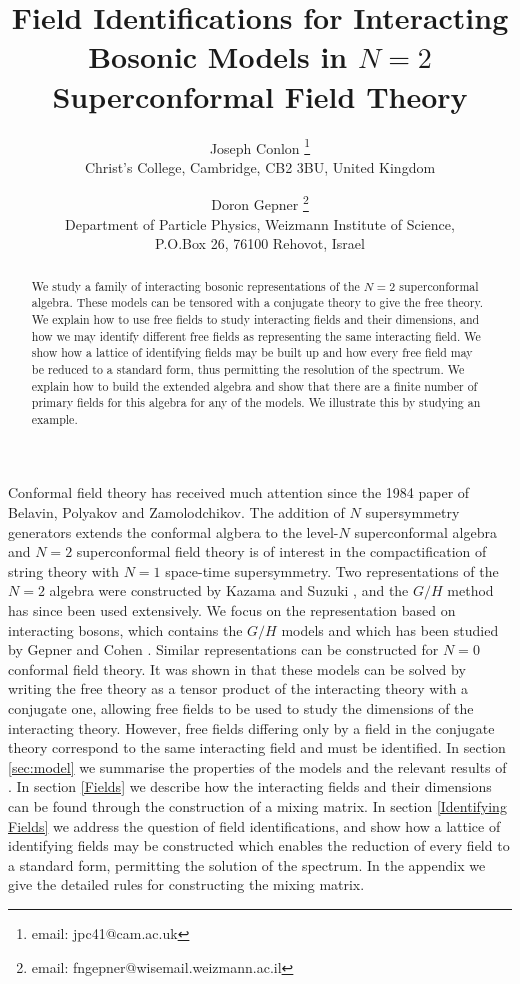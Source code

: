 \documentclass[a4paper,a4paper]{article}
\title{Field Identifications for Interacting Bosonic Models in $N=2$ Superconformal Field Theory}
\author{Joseph Conlon \footnote{email: jpc41@cam.ac.uk} \\ Christ's College, Cambridge, CB2 3BU, United Kingdom 
\and Doron Gepner \footnote{email: fngepner@wisemail.weizmann.ac.il}
\\Department of Particle Physics, Weizmann Institute of Science,\\ P.O.Box 26, 76100 Rehovot, Israel}
\begin{document}
\maketitle

\begin{abstract}
We study a family of interacting bosonic representations of the $N=2$ superconformal algebra. These models can
be tensored with a conjugate theory to give the free theory. We explain how to use
free fields to study interacting fields and their dimensions, and how we may
identify different free fields as representing the same interacting field. We show how a lattice of identifying fields
may be built up and how every free field may be reduced to a standard form, thus permitting the resolution of the spectrum. 
We explain how to build the extended algebra and show that there are a finite number of primary fields for
this algebra for any of the models.
We illustrate this by studying an example.
\end{abstract}

Conformal field theory has received much attention since the 1984 paper of Belavin, Polyakov
and Zamolodchikov\cite{Belavin}. The addition of $N$ supersymmetry generators extends the
conformal algbera to the level-$N$ superconformal algebra and $N=2$ superconformal field theory is
of interest in the compactification of string theory with $N=1$ space-time supersymmetry. \cite{Trieste} Two representations of 
the $N=2$ algebra were constructed by Kazama and Suzuki \cite{Kazama1}\cite{Kazama2}, and the $G/H$ method has since 
been used extensively. We focus on the representation based on interacting bosons, which contains the $G/H$ models and which
has been studied by Gepner and Cohen \cite{Gepner}\cite{Cohen}. Similar representations can be constructed for $N=0$
conformal field theory\cite{Kiritsis}.
It was shown in \cite{Gepner} that these models can be solved by writing the free theory as a tensor
product of the interacting theory with a conjugate one, allowing free fields to be used to study the dimensions of the interacting theory.
However,
free fields differing only by a field in the conjugate theory correspond to the same interacting field and must
be identified. 
In section \ref{sec:model} we summarise the properties of the models and the relevant results of \cite{Kazama2}\cite{Gepner}\cite{Cohen}. 
In section \ref{Fields} we describe how
the interacting fields and their dimensions can be found through the construction of a mixing matrix.
 In section \ref{Identifying Fields} we address the question of field identifications, and show how a
lattice of identifying fields may be constructed which enables the reduction of every field to a standard form, permitting the solution 
of the spectrum. In the appendix we give the detailed rules for constructing the mixing matrix.
\end{document}
